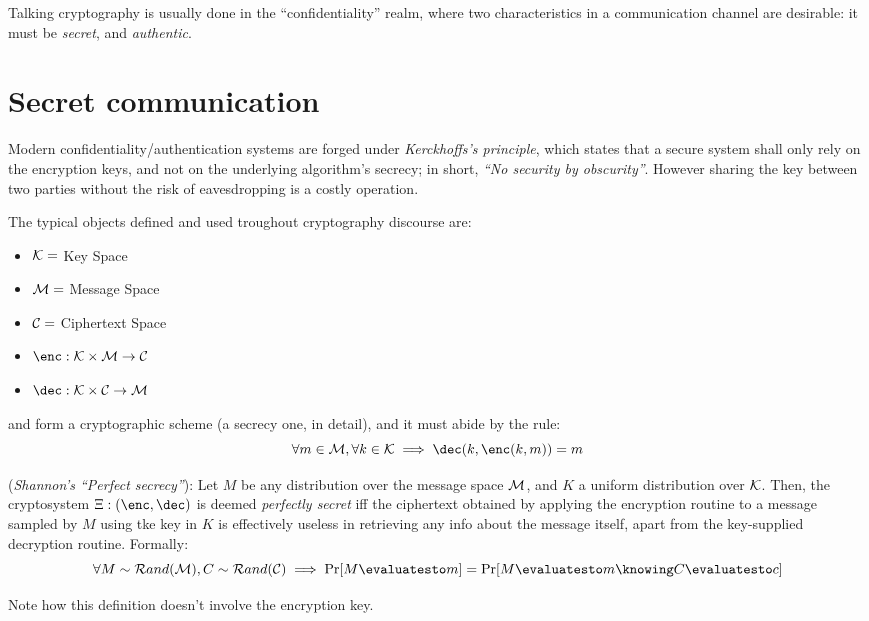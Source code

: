 
Talking cryptography is usually done in the ``confidentiality'' realm, where two characteristics in a communication channel are desirable: it must be \emph{secret}, and \emph{authentic}.

\section{Secret communication}


Modern confidentiality/authentication systems are forged under \emph{Kerckhoffs's principle}, which states that a secure system shall only rely on the encryption keys, and not on the underlying algorithm's secrecy; in short, \emph{``No security by obscurity''}. However sharing the key between two parties without the risk of eavesdropping is a costly operation.

The typical objects defined and used troughout cryptography discourse are:
\begin{itemize}
    \item $\mathcal{K} = $ Key Space
    \item $\mathcal{M} = $ Message Space
    \item $\mathcal{C} = $ Ciphertext Space
    \item $\enc: \K \times \M \to \C$
    \item $\dec: \K \times \C \to \M$
\end{itemize}

\enc and \dec form a cryptographic scheme (a secrecy one, in detail), and it must abide by the rule:
\[
    \forall m \in \M, \forall k \in \K \implies \dec(k, \enc(k, m)) = m
\]

\begin{definition}
    (\textit{Shannon's ``Perfect secrecy''}): Let $M$ be any distribution over the message space $\mathcal{M}$, and $K$ a uniform distribution over $\mathcal{K}$. Then, the cryptosystem $\Xi: (\enc, \dec)$ is deemed \emph{perfectly secret} iff the ciphertext obtained by applying the encryption routine to a message sampled by $M$ using tke key in $K$ is effectively useless in retrieving any info about the message itself, apart from the key-supplied decryption routine. Formally:
    \[
        \forall M \sim \mathcal{R}and(\M), C \sim \mathcal{R}and(\C) \implies \Pr[M \evaluatesto m] = \Pr[M \evaluatesto m \knowing C \evaluatesto c]
    \]
\end{definition}
Note how this definition doesn't involve the encryption key. %

